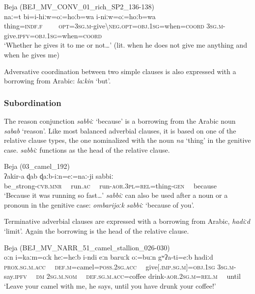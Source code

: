 \documentclass[output=paper]{langsci/langscibook}
\begin{document}
\ea\label{thing}
{{Beja (}BEJ\_MV\_CONV\_01\_rich\_SP2\_136-138)}\\
\gll naː=t bi=i-hiːw=oː=hoːb=wa i-niːw=oː=hoːb=wa\\
     thing=\textsc{indf.f}~~~~ \textsc{opt=3sg.m-}give\textsc{\textbackslash neg.opt=obj.1sg}=when=\textsc{coord} \textsc{3sg.m-}give.\textsc{ipfv=obj.1sg}=when=\textsc{coord}\\
\glt `Whether he gives it to me or not…' (lit. when he does not give me anything and when he gives me)
\z

Adversative coordination between two simple clauses is also expressed with a borrowing from Arabic: \textit{laːkin} ‘but’.


 \subsubsection{Subordination}

The reason conjunction \textit{sabbiː} ‘because’ is a borrowing from the Arabic noun \textit{sabab} ‘reason’. Like most balanced adverbial clauses, it is based on one of the relative clause types, the one nominalized with the noun \textit{na} ‘thing’ in the genitive case. \textit{sabbiː} functions as the head of the relative clause.

\ea
{Beja ({03\_camel\_192)}}\\
\gll ʔakir-a ɖab ɖaːb-iːn=eː=naː-ji sabbiː\\
     be\_strong-\textsc{cvb.mnr}~~ run.\textsc{ac}~~ run-\textsc{aor.3pl=rel}=thing-\textsc{gen}~~ because\\
\glt `Because it was running so fast…'
\z
\textit{sabbiː} can also be used after a noun or a pronoun in the genitive case: \textit{ombarijoːk} \textit{sabbiː} ‘because of you’.

Terminative adverbial clauses are expressed with a borrowing from Arabic, \textit{hadiːd} ‘limit’. Again the borrowing is the head of the relative clause.

\ea\label{ex:vanhove:}
{Beja (BEJ\_MV\_NARR\_51\_camel\_stallion\_026-030)}\\
\gll oːn i=kaːm=oːk heː=heːb i-ndi eːn baruːk oː=buːn gʷʔa-ti=eːb hadiːd\\
     \textsc{prox.sg.m.acc}~~ \textsc{def.m}=camel=\textsc{poss.2sg.acc}~~ give[.\textsc{imp.sg.m]=obj.1sg} \textsc{3sg.m}{}-say.\textsc{ipfv}~~ \textsc{dm} \textsc{2sg.m.nom}~~ \textsc{def.sg.m.acc}=coffee drink-\textsc{aor.2sg.m=rel.m}~~ until\\
\glt `Leave your camel with me, he says, until you have drunk your coffee!'
\z
\end{document}
